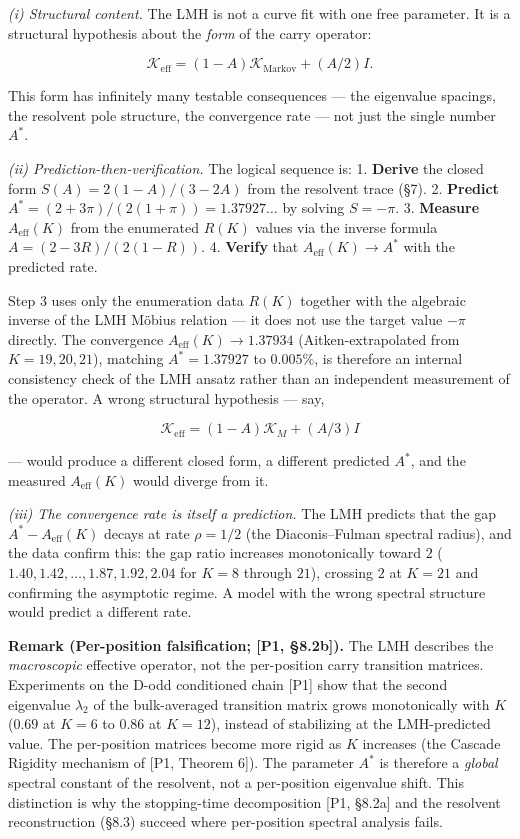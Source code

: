 \documentclass[
  11pt,
]{article}
\begin{document}
\emph{(i) Structural content.} The LMH is not a curve fit with one free
parameter. It is a structural hypothesis about the \emph{form} of the carry
operator:

\[\mathcal{K}_{\mathrm{eff}} = (1 - A)\mathcal{K}_{\mathrm{Markov}} + (A/2)I.\]

This form has infinitely many testable consequences --- the eigenvalue spacings,
the resolvent pole structure, the convergence rate --- not just the single
number \(A^{\ast}\).

\emph{(ii) Prediction-then-verification.} The logical sequence is: 1.
\textbf{Derive} the closed form \(S(A) = 2(1-A)/(3-2A)\) from the resolvent
trace (§7). 2. \textbf{Predict}
\(A^{\ast} = (2+3\pi)/(2(1+\pi)) = 1.37927\ldots\) by solving \(S = -\pi\). 3.
\textbf{Measure} \(A_{\mathrm{eff}}(K)\) from the enumerated \(R(K)\) values via
the inverse formula \(A = (2-3R)/(2(1-R))\). 4. \textbf{Verify} that
\(A_{\mathrm{eff}}(K) \to A^{\ast}\) with the predicted rate.

Step 3 uses only the enumeration data \(R(K)\) together with the algebraic
inverse of the LMH Möbius relation --- it does not use the target value \(-\pi\)
directly. The convergence \(A_{\mathrm{eff}}(K) \to 1.37934\)
(Aitken-extrapolated from \(K = 19, 20, 21\)), matching \(A^{\ast} = 1.37927\)
to \(0.005\%\), is therefore an internal consistency check of the LMH ansatz
rather than an independent measurement of the operator. A wrong structural
hypothesis --- say,

\[\mathcal{K}_{\mathrm{eff}} = (1-A)\mathcal{K}_M + (A/3)I\]

--- would produce a different closed form, a different predicted \(A^{\ast}\),
and the measured \(A_{\mathrm{eff}}(K)\) would diverge from it.

\emph{(iii) The convergence rate is itself a prediction.} The LMH predicts that
the gap \(A^{\ast} - A_{\mathrm{eff}}(K)\) decays at rate \(\rho = 1/2\) (the
Diaconis--Fulman spectral radius), and the data confirm this: the gap ratio
increases monotonically toward \(2\) (\(1.40, 1.42, \ldots, 1.87, 1.92, 2.04\)
for \(K = 8\) through \(21\)), crossing \(2\) at \(K = 21\) and confirming the
asymptotic regime. A model with the wrong spectral structure would predict a
different rate.

\textbf{Remark (Per-position falsification; {[}P1, §8.2b{]}).} The LMH describes
the \emph{macroscopic} effective operator, not the per-position carry transition
matrices. Experiments on the D-odd conditioned chain {[}P1{]} show that the
second eigenvalue \(\lambda_2\) of the bulk-averaged transition matrix grows
monotonically with \(K\) (\(0.69\) at \(K = 6\) to \(0.86\) at \(K = 12\)),
instead of stabilizing at the LMH-predicted value. The per-position matrices
become more rigid as \(K\) increases (the Cascade Rigidity mechanism of {[}P1,
Theorem 6{]}). The parameter \(A^{\ast}\) is therefore a \emph{global} spectral
constant of the resolvent, not a per-position eigenvalue shift. This distinction
is why the stopping-time decomposition {[}P1, §8.2a{]} and the resolvent
reconstruction (§8.3) succeed where per-position spectral analysis fails.
\end{document}

